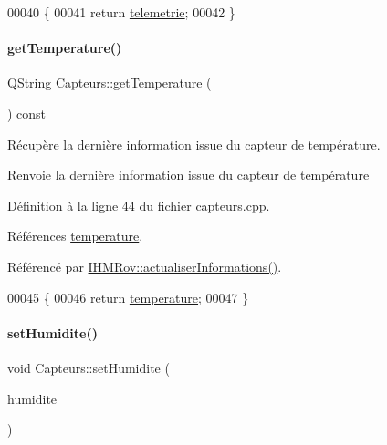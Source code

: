\begin{DoxyCode}
00040 \{
00041     \textcolor{keywordflow}{return} \hyperlink{class_capteurs_a336a4c4ad6ae1a49d21b265d2953e24b}{telemetrie};
00042 \}
\end{DoxyCode}
\mbox{\label{class_capteurs_aa1346e5cbea9e37afc3694a0ea86bd99}} 
\paragraph{\texorpdfstring{get\+Temperature()}{getTemperature()}}
{\footnotesize\ttfamily Q\+String Capteurs\+::get\+Temperature (\begin{DoxyParamCaption}{ }\end{DoxyParamCaption}) const}



Récupère la dernière information issue du capteur de température. 

\begin{DoxyReturn}{Renvoie}
la dernière information issue du capteur de température 
\end{DoxyReturn}


Définition à la ligne \hyperlink{capteurs_8cpp_source_l00044}{44} du fichier \hyperlink{capteurs_8cpp_source}{capteurs.\+cpp}.



Références \hyperlink{capteurs_8h_source_l00023}{temperature}.



Référencé par \hyperlink{ihmrov_8cpp_source_l00110}{I\+H\+M\+Rov\+::actualiser\+Informations()}.


\begin{DoxyCode}
00045 \{
00046     \textcolor{keywordflow}{return} \hyperlink{class_capteurs_acf6f97c1e121ae0f53c9a56430d42dfe}{temperature};
00047 \}
\end{DoxyCode}
\mbox{\label{class_capteurs_aafb06e1746006cdb72e92dc7a0519a2e}} 
\paragraph{\texorpdfstring{set\+Humidite()}{setHumidite()}}
{\footnotesize\ttfamily void Capteurs\+::set\+Humidite (\begin{DoxyParamCaption}\item[{Q\+String}]{humidite }\end{DoxyParamCaption})}



